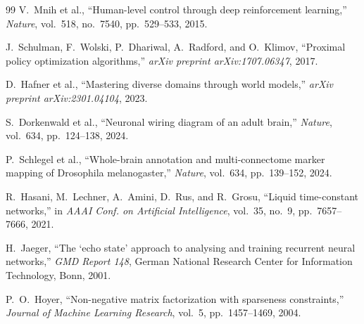 \documentclass[10pt,twocolumn]{article}
\begin{document}
\begin{thebibliography}{99}
V.~Mnih et al., ``Human-level control through deep reinforcement learning,'' \textit{Nature}, vol.~518, no.~7540, pp.~529--533, 2015.

J.~Schulman, F.~Wolski, P.~Dhariwal, A.~Radford, and O.~Klimov, ``Proximal policy optimization algorithms,'' \textit{arXiv preprint arXiv:1707.06347}, 2017.

D.~Hafner et al., ``Mastering diverse domains through world models,'' \textit{arXiv preprint arXiv:2301.04104}, 2023.

S.~Dorkenwald et al., ``Neuronal wiring diagram of an adult brain,'' \textit{Nature}, vol.~634, pp.~124--138, 2024.

\newpage

P.~Schlegel et al., ``Whole-brain annotation and multi-connectome marker mapping of Drosophila melanogaster,'' \textit{Nature}, vol.~634, pp.~139--152, 2024.

R.~Hasani, M.~Lechner, A.~Amini, D.~Rus, and R.~Grosu, ``Liquid time-constant networks,'' in \textit{AAAI Conf. on Artificial Intelligence}, vol.~35, no.~9, pp.~7657--7666, 2021.

H.~Jaeger, ``The `echo state' approach to analysing and training recurrent neural networks,'' \textit{GMD Report 148}, German National Research Center for Information Technology, Bonn, 2001.

P.~O.~Hoyer, ``Non-negative matrix factorization with sparseness constraints,'' \textit{Journal of Machine Learning Research}, vol.~5, pp.~1457--1469, 2004.
\end{thebibliography}
\end{document}
